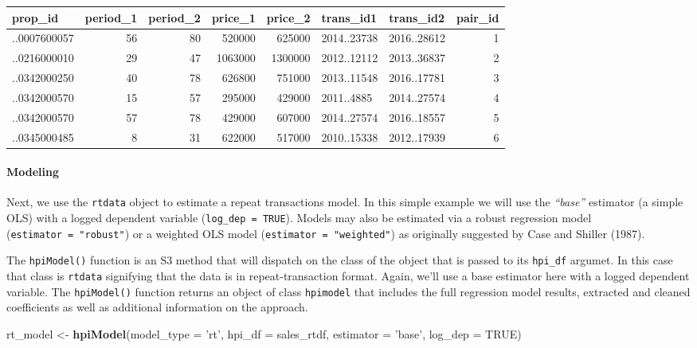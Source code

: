\documentclass[]{article}
\newenvironment{Shaded}{\begin{snugshade}}{\end{snugshade}}
\newcommand{\KeywordTok}[1]{\textcolor[rgb]{0.13,0.29,0.53}{\textbf{#1}}}
\newcommand{\DataTypeTok}[1]{\textcolor[rgb]{0.13,0.29,0.53}{#1}}
\newcommand{\StringTok}[1]{\textcolor[rgb]{0.31,0.60,0.02}{#1}}
\newcommand{\OtherTok}[1]{\textcolor[rgb]{0.56,0.35,0.01}{#1}}
\newcommand{\NormalTok}[1]{#1}
\let\oldparagraph\paragraph
\renewcommand{\paragraph}[1]{\oldparagraph{#1}\mbox{}}
\begin{document}
\begin{longtable}[]{@{}lrrrrllr@{}}
\toprule
prop\_id & period\_1 & period\_2 & price\_1 & price\_2 & trans\_id1 &
trans\_id2 & pair\_id\tabularnewline
\midrule
\endhead
..0007600057 & 56 & 80 & 520000 & 625000 & 2014..23738 & 2016..28612 &
1\tabularnewline
..0216000010 & 29 & 47 & 1063000 & 1300000 & 2012..12112 & 2013..36837 &
2\tabularnewline
..0342000250 & 40 & 78 & 626800 & 751000 & 2013..11548 & 2016..17781 &
3\tabularnewline
..0342000570 & 15 & 57 & 295000 & 429000 & 2011..4885 & 2014..27574 &
4\tabularnewline
..0342000570 & 57 & 78 & 429000 & 607000 & 2014..27574 & 2016..18557 &
5\tabularnewline
..0345000485 & 8 & 31 & 622000 & 517000 & 2010..15338 & 2012..17939 &
6\tabularnewline
\bottomrule
\end{longtable}

\paragraph{Modeling}\label{modeling}

Next, we use the \texttt{rtdata} object to estimate a repeat
transactions model. In this simple example we will use the
\emph{``base''} estimator (a simple OLS) with a logged dependent
variable (\texttt{log\_dep\ =\ TRUE}). Models may also be estimated via
a robust regression model (\texttt{estimator\ =\ "robust"}) or a
weighted OLS model (\texttt{estimator\ =\ "weighted"}) as originally
suggested by Case and Shiller (1987).

The \texttt{hpiModel()} function is an S3 method that will dispatch on
the class of the object that is passed to its \texttt{hpi\_df} argumet.
In this case that class is \texttt{rtdata} signifying that the data is
in repeat-transaction format. Again, we'll use a base estimator here
with a logged dependent variable. The \texttt{hpiModel()} function
returns an object of class \texttt{hpimodel} that includes the full
regression model results, extracted and cleaned coefficients as well as
additional information on the approach.

\begin{Shaded}
\begin{Highlighting}[]
\NormalTok{  rt_model <-}\StringTok{ }\KeywordTok{hpiModel}\NormalTok{(}\DataTypeTok{model_type =} \StringTok{'rt'}\NormalTok{,}
                       \DataTypeTok{hpi_df =}\NormalTok{ sales_rtdf,}
                       \DataTypeTok{estimator =} \StringTok{'base'}\NormalTok{,}
                       \DataTypeTok{log_dep =} \OtherTok{TRUE}\NormalTok{)}
\end{Highlighting}
\end{Shaded}
\end{document}
